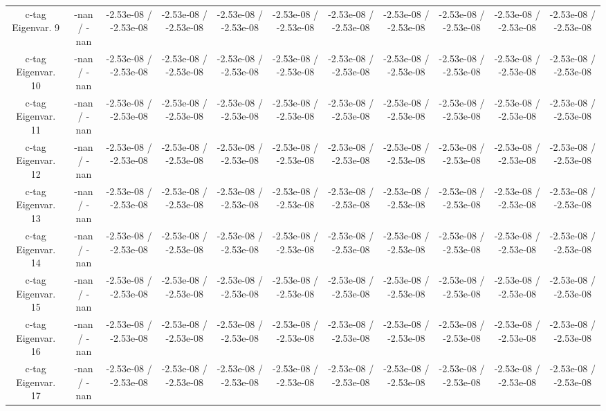 \begin{table}[htbp]
\begin{center}
\begin{tabular}{|c|c|c|c|c|c|c|c|c|c|c|}
  c-tag Eigenvar. 9 & -nan / -nan & -2.53e-08 / -2.53e-08 & -2.53e-08 / -2.53e-08 & -2.53e-08 / -2.53e-08 & -2.53e-08 / -2.53e-08 & -2.53e-08 / -2.53e-08 & -2.53e-08 / -2.53e-08 & -2.53e-08 / -2.53e-08 & -2.53e-08 / -2.53e-08 & -2.53e-08 / -2.53e-08 \\ 
  c-tag Eigenvar. 10 & -nan / -nan & -2.53e-08 / -2.53e-08 & -2.53e-08 / -2.53e-08 & -2.53e-08 / -2.53e-08 & -2.53e-08 / -2.53e-08 & -2.53e-08 / -2.53e-08 & -2.53e-08 / -2.53e-08 & -2.53e-08 / -2.53e-08 & -2.53e-08 / -2.53e-08 & -2.53e-08 / -2.53e-08 \\ 
  c-tag Eigenvar. 11 & -nan / -nan & -2.53e-08 / -2.53e-08 & -2.53e-08 / -2.53e-08 & -2.53e-08 / -2.53e-08 & -2.53e-08 / -2.53e-08 & -2.53e-08 / -2.53e-08 & -2.53e-08 / -2.53e-08 & -2.53e-08 / -2.53e-08 & -2.53e-08 / -2.53e-08 & -2.53e-08 / -2.53e-08 \\ 
  c-tag Eigenvar. 12 & -nan / -nan & -2.53e-08 / -2.53e-08 & -2.53e-08 / -2.53e-08 & -2.53e-08 / -2.53e-08 & -2.53e-08 / -2.53e-08 & -2.53e-08 / -2.53e-08 & -2.53e-08 / -2.53e-08 & -2.53e-08 / -2.53e-08 & -2.53e-08 / -2.53e-08 & -2.53e-08 / -2.53e-08 \\ 
  c-tag Eigenvar. 13 & -nan / -nan & -2.53e-08 / -2.53e-08 & -2.53e-08 / -2.53e-08 & -2.53e-08 / -2.53e-08 & -2.53e-08 / -2.53e-08 & -2.53e-08 / -2.53e-08 & -2.53e-08 / -2.53e-08 & -2.53e-08 / -2.53e-08 & -2.53e-08 / -2.53e-08 & -2.53e-08 / -2.53e-08 \\ 
  c-tag Eigenvar. 14 & -nan / -nan & -2.53e-08 / -2.53e-08 & -2.53e-08 / -2.53e-08 & -2.53e-08 / -2.53e-08 & -2.53e-08 / -2.53e-08 & -2.53e-08 / -2.53e-08 & -2.53e-08 / -2.53e-08 & -2.53e-08 / -2.53e-08 & -2.53e-08 / -2.53e-08 & -2.53e-08 / -2.53e-08 \\ 
  c-tag Eigenvar. 15 & -nan / -nan & -2.53e-08 / -2.53e-08 & -2.53e-08 / -2.53e-08 & -2.53e-08 / -2.53e-08 & -2.53e-08 / -2.53e-08 & -2.53e-08 / -2.53e-08 & -2.53e-08 / -2.53e-08 & -2.53e-08 / -2.53e-08 & -2.53e-08 / -2.53e-08 & -2.53e-08 / -2.53e-08 \\ 
  c-tag Eigenvar. 16 & -nan / -nan & -2.53e-08 / -2.53e-08 & -2.53e-08 / -2.53e-08 & -2.53e-08 / -2.53e-08 & -2.53e-08 / -2.53e-08 & -2.53e-08 / -2.53e-08 & -2.53e-08 / -2.53e-08 & -2.53e-08 / -2.53e-08 & -2.53e-08 / -2.53e-08 & -2.53e-08 / -2.53e-08 \\ 
  c-tag Eigenvar. 17 & -nan / -nan & -2.53e-08 / -2.53e-08 & -2.53e-08 / -2.53e-08 & -2.53e-08 / -2.53e-08 & -2.53e-08 / -2.53e-08 & -2.53e-08 / -2.53e-08 & -2.53e-08 / -2.53e-08 & -2.53e-08 / -2.53e-08 & -2.53e-08 / -2.53e-08 & -2.53e-08 / -2.53e-08 \\ 

\end{tabular}
\end{center}
\end{table}
